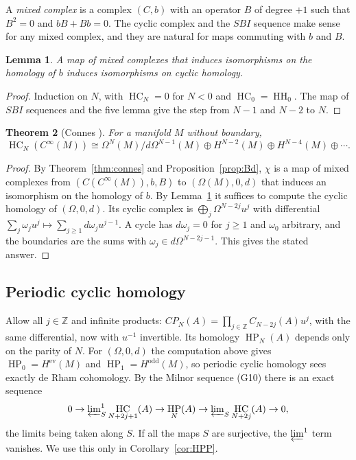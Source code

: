 \documentclass[11pt,oneside,reqno]{article}
\DeclareMathOperator{\HH}{HH}
\DeclareMathOperator{\HC}{HC}
\DeclareMathOperator{\HP}{HP}
\newcommand{\Z}{\mathbb Z}
\newcommand{\CI}{C^\infty}
\newcommand{\Om}{\Omega}
\theoremstyle{plain}
\newtheorem{theorem}{Theorem}[section]
\newtheorem{lemma}[theorem]{Lemma}
\theoremstyle{definition}
\theoremstyle{remark}
\begin{document}
A \emph{mixed complex} is a complex \((C,b)\) with an operator \(B\) of degree
\(+1\) such that \(B^2=0\) and \(bB+Bb=0\). The cyclic complex and the \(SBI\)
sequence make sense for any mixed complex, and they are natural for maps
commuting with \(b\) and \(B\).

\begin{lemma}\label{lem:HHtoHC}
A map of mixed complexes that induces isomorphisms on the homology of
\(b\) induces isomorphisms on cyclic homology.
\end{lemma}

\begin{proof}
Induction on \(N\), with \(\HC_N=0\) for \(N<0\) and \(\HC_0=\HH_0\). The map of
\(SBI\) sequences and the five lemma give the step from \(N-1\) and \(N-2\) to
\(N\).
\end{proof}

\begin{theorem}[Connes \cite{Connes}]\label{thm:HCsmooth}
For a manifold \(M\) without boundary,
\[
 \HC_N(\CI(M))\cong\Om^N(M)/d\Om^{N-1}(M)\oplus H^{N-2}(M)\oplus
 H^{N-4}(M)\oplus\cdots .
\]
\end{theorem}

\begin{proof}
By Theorem~\ref{thm:connes} and Proposition~\ref{prop:Bd}, \(\chi\) is a map
of mixed complexes from \((C(\CI(M)),b,B)\) to \((\Om(M),0,d)\) that induces an
isomorphism on the homology of \(b\). By Lemma~\ref{lem:HHtoHC} it suffices
to compute the cyclic homology of \((\Om,0,d)\). Its cyclic complex is
\(\bigoplus_j\Om^{N-2j}u^j\) with differential
\(\sum_j\omega_ju^j\mapsto\sum_{j\ge1}d\omega_ju^{j-1}\). A cycle has
\(d\omega_j=0\) for \(j\ge1\) and \(\omega_0\) arbitrary, and the boundaries are
the sums with \(\omega_j\in d\Om^{N-2j-1}\). This gives the stated answer.
\end{proof}

\subsection{Periodic cyclic homology}\label{subsec:HP}
Allow all \(j\in\Z\) and infinite products:
\(CP_N(A)=\prod_{j\in\Z}C_{N-2j}(A)u^j\), with the same differential, now with
\(u^{-1}\) invertible. Its homology \(\HP_N(A)\) depends only on the parity of
\(N\). For \((\Om,0,d)\) the computation above gives
\(\HP_0=H^{\mathrm{ev}}(M)\) and \(\HP_1=H^{\mathrm{odd}}(M)\), so periodic
cyclic homology sees exactly de Rham cohomology. By the Milnor sequence
(G10) there is an exact sequence
\[
 0\to\varprojlim\nolimits^1_S\HC_{N+2j+1}(A)\to\HP_N(A)\to
 \varprojlim\nolimits_S\HC_{N+2j}(A)\to0 ,
\]
the limits being taken along \(S\). If all the maps \(S\) are surjective,
the \(\varprojlim^1\) term vanishes. We use this only in
Corollary~\ref{cor:HPP}.
\end{document}
